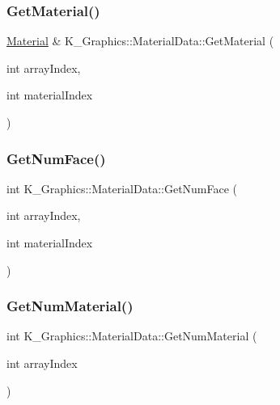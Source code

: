 \subsubsection{\texorpdfstring{Get\+Material()}{GetMaterial()}}
{\footnotesize\ttfamily \mbox{\hyperlink{struct_k___graphics_1_1_material}{Material}} \& K\+\_\+\+Graphics\+::\+Material\+Data\+::\+Get\+Material (\begin{DoxyParamCaption}\item[{int}]{array\+Index,  }\item[{int}]{material\+Index }\end{DoxyParamCaption})}

\mbox{\label{class_k___graphics_1_1_material_data_a98e8c1c9eef3bb242a1eff791514b18e}} 
\subsubsection{\texorpdfstring{Get\+Num\+Face()}{GetNumFace()}}
{\footnotesize\ttfamily int K\+\_\+\+Graphics\+::\+Material\+Data\+::\+Get\+Num\+Face (\begin{DoxyParamCaption}\item[{int}]{array\+Index,  }\item[{int}]{material\+Index }\end{DoxyParamCaption})}

\mbox{\label{class_k___graphics_1_1_material_data_a20e0e4f37a782d66093cf1388db1ac33}} 
\subsubsection{\texorpdfstring{Get\+Num\+Material()}{GetNumMaterial()}}
{\footnotesize\ttfamily int K\+\_\+\+Graphics\+::\+Material\+Data\+::\+Get\+Num\+Material (\begin{DoxyParamCaption}\item[{int}]{array\+Index }\end{DoxyParamCaption})}

